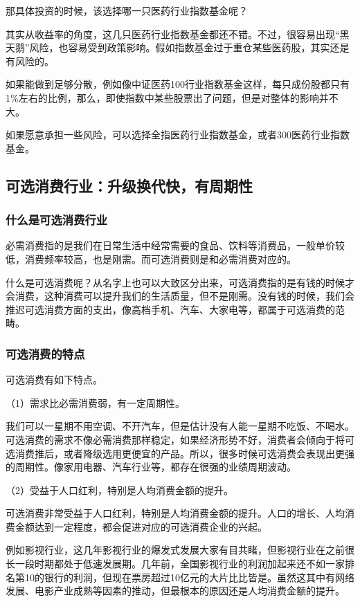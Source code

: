 那具体投资的时候，该选择哪一只医药行业指数基金呢？

其实从收益率的角度，这几只医药行业指数基金都还不错。不过，很容易出现“黑天鹅”风险，也容易受到政策影响。假如指数基金过于重仓某些医药股，其实还是有风险的。

如果能做到足够分散，例如像中证医药100行业指数基金这样，每只成份股都只有1\%左右的比例，那么，即使指数中某些股票出了问题，但是对整体的影响并不大。

如果愿意承担一些风险，可以选择全指医药行业指数基金，或者300医药行业指数基金。

\subsection{可选消费行业：升级换代快，有周期性}
\subsubsection{什么是可选消费行业}

必需消费指的是我们在日常生活中经常需要的食品、饮料等消费品，一般单价较低，消费频率较高，也是刚需。而可选消费则是和必需消费对应的。

什么是可选消费呢？从名字上也可以大致区分出来，可选消费指的是有钱的时候才会消费，这种消费可以提升我们的生活质量，但不是刚需。没有钱的时候，我们会推迟可选消费方面的支出，像高档手机、汽车、大家电等，都属于可选消费的范畴。

\subsubsection{可选消费的特点}

可选消费有如下特点。

（1）需求比必需消费弱，有一定周期性。

我们可以一星期不用空调、不开汽车，但是估计没有人能一星期不吃饭、不喝水。可选消费的需求不像必需消费那样稳定，如果经济形势不好，消费者会倾向于将可选消费推后，或者降级选用更便宜的产品。所以，很多时候可选消费会表现出更强的周期性。像家用电器、汽车行业等，都存在很强的业绩周期波动。

（2）受益于人口红利，特别是人均消费金额的提升。

可选消费非常受益于人口红利，特别是人均消费金额的提升。人口的增长、人均消费金额达到一定程度，都会促进对应的可选消费企业的兴起。

例如影视行业，这几年影视行业的爆发式发展大家有目共睹，但影视行业在之前很长一段时期都处于低速发展期。几年前，全国影视行业的利润加起来还不如一家排名第10的银行的利润，但现在票房超过10亿元的大片比比皆是。虽然这其中有网络发展、电影产业成熟等因素的推动，但最根本的原因还是人均消费金额的提升。

